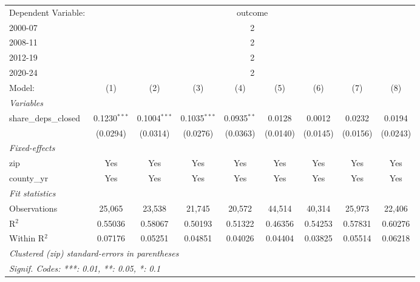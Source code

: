 \begingroup
\centering
\begin{tabular}{lcccccccc}
   \tabularnewline \midrule \midrule
   Dependent Variable: & \multicolumn{8}{c}{outcome}\\
   2000-07 & \multicolumn{8}{c}{2} \\ 
   2008-11 & \multicolumn{8}{c}{2} \\ 
   2012-19 & \multicolumn{8}{c}{2} \\ 
   2020-24 & \multicolumn{8}{c}{2} \\ 
   Model:                & (1)            & (2)            & (3)            & (4)           & (5)      & (6)      & (7)      & (8)\\  
   \midrule
   \emph{Variables}\\
   share\_deps\_closed   & 0.1230$^{***}$ & 0.1004$^{***}$ & 0.1035$^{***}$ & 0.0935$^{**}$ & 0.0128   & 0.0012   & 0.0232   & 0.0194\\   
                         & (0.0294)       & (0.0314)       & (0.0276)       & (0.0363)      & (0.0140) & (0.0145) & (0.0156) & (0.0243)\\   
   \midrule
   \emph{Fixed-effects}\\
   zip                   & Yes            & Yes            & Yes            & Yes           & Yes      & Yes      & Yes      & Yes\\  
   county\_yr            & Yes            & Yes            & Yes            & Yes           & Yes      & Yes      & Yes      & Yes\\  
   \midrule
   \emph{Fit statistics}\\
   Observations          & 25,065         & 23,538         & 21,745         & 20,572        & 44,514   & 40,314   & 25,973   & 22,406\\  
   R$^2$                 & 0.55036        & 0.58067        & 0.50193        & 0.51322       & 0.46356  & 0.54253  & 0.57831  & 0.60276\\  
   Within R$^2$          & 0.07176        & 0.05251        & 0.04851        & 0.04026       & 0.04404  & 0.03825  & 0.05514  & 0.06218\\  
   \midrule \midrule
   \multicolumn{9}{l}{\emph{Clustered (zip) standard-errors in parentheses}}\\
   \multicolumn{9}{l}{\emph{Signif. Codes: ***: 0.01, **: 0.05, *: 0.1}}\\
\end{tabular}
\par\endgroup
